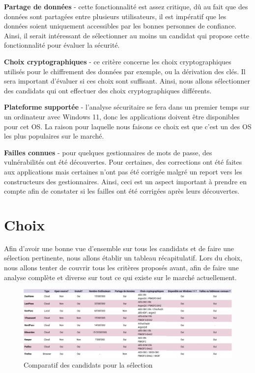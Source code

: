 \textbf{Partage de données} - cette fonctionnalité est assez critique, dû au fait que des données sont partagées
entre plusieurs utilisateurs, il est impératif que les données soient uniquement accessibles par les bonnes personnes
de confiance. Ainsi, il serait intéressant de sélectionner au moins un candidat qui propose cette fonctionnalité pour
évaluer la sécurité.

\textbf{Choix cryptographiques} - ce critère concerne les choix cryptographiques utilisés pour le chiffrement des
données par exemple, ou la dérivation des clés. Il sera important d'évaluer si ces choix sont suffisant. Ainsi, nous
allons sélectionner des candidats qui ont effectuer des choix cryptographiques différents.

\textbf{Plateforme supportée} - l'analyse sécuritaire se fera dans un premier temps sur un ordinateur avec Windows
11, donc les applications doivent être disponibles pour cet OS. La raison pour laquelle nous faisons ce choix est que c'est un des OS les plus populaires sur le marché.

\textbf{Failles connues} - pour quelques gestionnaires de mots de passe, des vulnérabilités ont été découvertes. Pour
certaines, des corrections ont été faites aux applications mais certaines n'ont pas été corrigée malgré un report
vers les constructeurs des gestionnaires. Ainsi, ceci est un aspect important à prendre en compte afin de constater
si les failles ont été corrigées après leurs découvertes.

\section{Choix}
Afin d'avoir une bonne vue d'ensemble sur tous les candidats et de faire une sélection pertinente, nous allons
établir un tableau récapitulatif. Lors du choix, nous allons tenter de couvrir tous les critères proposés avant, afin
de faire une analyse complète et diverse sur tout ce qui existe sur le marché actuellement.

\begin{figure}[H]
	\centering
	\includegraphics[scale=0.5, angle=90]{images/selection_choix.png}
	\caption{Comparatif des candidats pour la sélection}
\end{figure}

